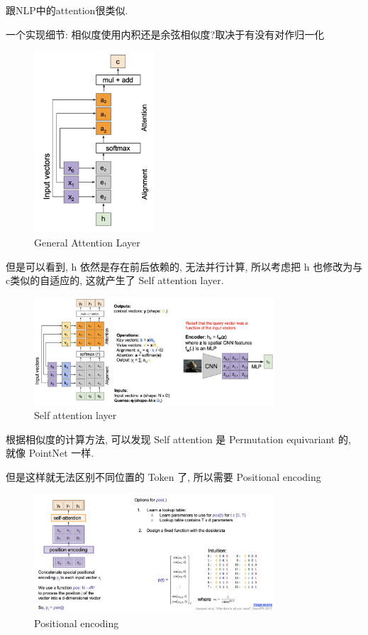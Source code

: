 跟NLP中的attention很类似.

一个实现细节: 相似度使用内积还是余弦相似度?取决于有没有对作归一化

\begin{figure}[H]
    \centering
    \includegraphics[width=0.4\textwidth]{figures/general_atten.png}
    \caption{General Attention Layer}
    \label{fig:general_atten}
\end{figure}

但是可以看到, h 依然是存在前后依赖的, 无法并行计算, 所以考虑把 h 也修改为与c类似的自适应的, 这就产生了 Self attention layer.

\begin{figure}[H]
    \centering
    \includegraphics[width=0.8\textwidth]{figures/paralle_q.png}
    \caption{Self attention layer}
    \label{fig:paralle_q}
\end{figure}

根据相似度的计算方法, 可以发现 Self attention 是 Permutation equivariant 的, 就像 PointNet 一样.

但是这样就无法区别不同位置的 Token 了, 所以需要 Positional encoding

\begin{figure}[H]
    \centering
    \includegraphics[width=0.8\textwidth]{figures/pos_encoding.png}
    \caption{Positional encoding}
    \label{fig:pos_encoding}
\end{figure}

